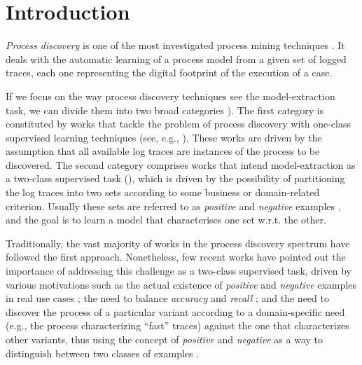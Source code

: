 

\section{Introduction}
\label{sec:introduction}



\emph{Process discovery} is one of the most investigated process mining techniques \cite{2012-Aalst}. It deals with the automatic learning of a process model from a given set of logged traces, each one representing the digital footprint of the execution of a case.

If we focus on the way process discovery techniques see the model-extraction task, we can divide them into two broad categories \cite{2018-Ponce}). The first category is constituted by works that tackle the problem of process discovery with one-class supervised learning techniques (see, e.g., \cite{2004-Aalst,2003-Weijters,2007-Gunther,2010-Aalst}). These works are driven by the assumption that all available log traces are instances of the process to be discovered. The second category comprises works that intend model-extraction as a two-class supervised task (\cite{2006-Maruster,2009-Goedertier,2009-Chesani}), which is driven by the possibility of partitioning the log traces into two sets according to some business or domain-related criterion. Usually these sets are referred to as \emph{positive} and \emph{negative} examples \cite{2018-Ponce}, and the goal is to learn a model that characterises one set w.r.t. the other.

Traditionally, the vast majority of works in the process discovery spectrum have followed the first approach. Nonetheless, few recent works \cite{DBLP:conf/bpm/SlaatsDB21,deviant-arxiv} have pointed out the importance of addressing this challenge as a two-class supervised task, driven by various motivations such as the actual existence of \emph{positive} and \emph{negative} examples in real use cases \cite{DBLP:conf/bpm/SlaatsDB21}; the need to balance \emph{accuracy} and \emph{recall} \cite{DBLP:conf/bpm/SlaatsDB21}; and the need to discover the process of a particular variant according to a domain-specific need (e.g., the process characterizing ``fast'' traces) against the one that characterizes other variants, thus using the concept of \emph{positive} and \emph{negative} as a way to distinguish between two classes of examples \cite{deviant-arxiv}.  


